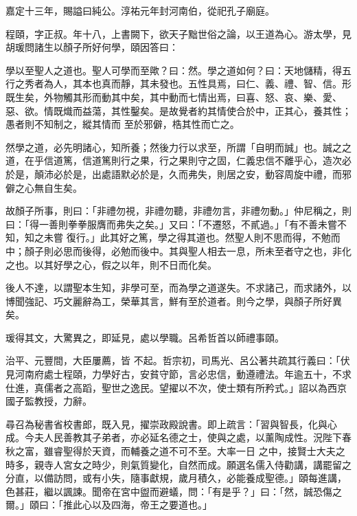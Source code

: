 \begin{pinyinscope}
 嘉定十三年，賜謚曰純公。淳祐元年封河南伯，從祀孔子廟庭。



 程頤，字正叔。年十八，上書闕下，欲天子黜世俗之論，以王道為心。游太學，見胡瑗問諸生以顏子所好何學，頤因答曰：



 學以至聖人之道也。聖人可學而至歟？曰：然。學之道如何？曰：天地儲精，得五行之秀者為人，其本也真而靜，其未發也。五性具焉，曰仁、義、禮、智、信。形既生矣，外物觸其形而動其中矣，其中動而七情出焉，曰喜、怒、哀、樂、愛、惡、欲。情既熾而益蕩，其性鑿矣。是故覺者約其情使合於中，正其心，養其性；愚者則不知制之，縱其情而
 至於邪僻，梏其性而亡之。



 然學之道，必先明諸心，知所養；然後力行以求至，所謂「自明而誠」也。誠之之道，在乎信道篤，信道篤則行之果，行之果則守之固，仁義忠信不離乎心，造次必於是，顛沛必於是，出處語默必於是，久而弗失，則居之安，動容周旋中禮，而邪僻之心無自生矣。



 故顏子所事，則曰：「非禮勿視，非禮勿聽，非禮勿言，非禮勿動。」仲尼稱之，則曰：「得一善則拳拳服膺而弗失之矣。」又曰：「不遷怒，不貳過。」「有不善未嘗不知，知之未嘗
 復行。」此其好之篤，學之得其道也。然聖人則不思而得，不勉而中；顏子則必思而後得，必勉而後中。其與聖人相去一息，所未至者守之也，非化之也。以其好學之心，假之以年，則不日而化矣。



 後人不達，以謂聖本生知，非學可至，而為學之道遂失。不求諸己，而求諸外，以博聞強記、巧文麗辭為工，榮華其言，鮮有至於道者。則今之學，與顏子所好異矣。



 瑗得其文，大驚異之，即延見，處以學職。呂希哲首以師禮事頤。



 治平、元豐間，大臣屢薦，皆
 不起。哲宗初，司馬光、呂公著共疏其行義曰：「伏見河南府處士程頤，力學好古，安貧守節，言必忠信，動遵禮法。年逾五十，不求仕進，真儒者之高蹈，聖世之逸民。望擢以不次，使士類有所矜式。」詔以為西京國子監教授，力辭。



 尋召為秘書省校書郎，既入見，擢崇政殿說書。即上疏言：「習與智長，化與心成。今夫人民善教其子弟者，亦必延名德之士，使與之處，以薰陶成性。況陛下春秋之富，雖睿聖得於天資，而輔養之道不可不至。大率一日
 之中，接賢士大夫之時多，親寺人宮女之時少，則氣質變化，自然而成。願選名儒入侍勸講，講罷留之分直，以備訪問，或有小失，隨事獻規，歲月積久，必能養成聖德。」頤每進講，色甚莊，繼以諷諫。聞帝在宮中盥而避蟻，問：「有是乎？」曰：「然，誠恐傷之爾。」頤曰：「推此心以及四海，帝王之要道也。」




\end{pinyinscope}
